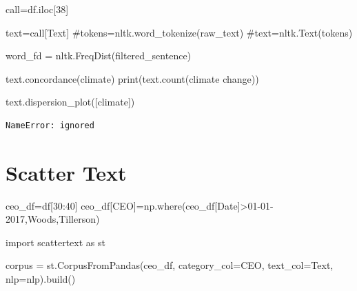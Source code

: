 \documentclass[
  letterpaper,
  DIV=11,
  numbers=noendperiod]{scrreprt}
\newenvironment{Shaded}{\begin{snugshade}}{\end{snugshade}}
\newcommand{\BuiltInTok}[1]{\textcolor[rgb]{0.00,0.23,0.31}{#1}}
\newcommand{\CommentTok}[1]{\textcolor[rgb]{0.37,0.37,0.37}{#1}}
\newcommand{\DecValTok}[1]{\textcolor[rgb]{0.68,0.00,0.00}{#1}}
\newcommand{\ImportTok}[1]{\textcolor[rgb]{0.00,0.46,0.62}{#1}}
\newcommand{\NormalTok}[1]{\textcolor[rgb]{0.00,0.23,0.31}{#1}}
\newcommand{\OperatorTok}[1]{\textcolor[rgb]{0.37,0.37,0.37}{#1}}
\newcommand{\StringTok}[1]{\textcolor[rgb]{0.13,0.47,0.30}{#1}}
\begin{document}
\begin{Shaded}
\begin{Highlighting}[]
\NormalTok{call}\OperatorTok{=}\NormalTok{df.iloc[}\DecValTok{38}\NormalTok{]}

\NormalTok{text}\OperatorTok{=}\NormalTok{call[}\StringTok{\textquotesingle{}Text\textquotesingle{}}\NormalTok{]}
\CommentTok{\#tokens=nltk.word\_tokenize(raw\_text)}
\CommentTok{\#text=nltk.Text(tokens)}

\NormalTok{word\_fd }\OperatorTok{=}\NormalTok{ nltk.FreqDist(filtered\_sentence)}

\NormalTok{text.concordance(}\StringTok{\textquotesingle{}climate\textquotesingle{}}\NormalTok{)}
\BuiltInTok{print}\NormalTok{(text.count(}\StringTok{\textquotesingle{}climate change\textquotesingle{}}\NormalTok{))}

\NormalTok{text.dispersion\_plot([}\StringTok{\textquotesingle{}climate\textquotesingle{}}\NormalTok{])}
\end{Highlighting}
\end{Shaded}

\begin{verbatim}
NameError: ignored
\end{verbatim}

\hypertarget{scatter-text}{%
\section{Scatter Text}\label{scatter-text}}

\begin{Shaded}
\begin{Highlighting}[]
\NormalTok{ceo\_df}\OperatorTok{=}\NormalTok{df[}\DecValTok{30}\NormalTok{:}\DecValTok{40}\NormalTok{]}
\NormalTok{ceo\_df[}\StringTok{\textquotesingle{}CEO\textquotesingle{}}\NormalTok{]}\OperatorTok{=}\NormalTok{np.where(ceo\_df[}\StringTok{\textquotesingle{}Date\textquotesingle{}}\NormalTok{]}\OperatorTok{\textgreater{}}\StringTok{\textquotesingle{}01{-}01{-}2017\textquotesingle{}}\NormalTok{,}\StringTok{\textquotesingle{}Woods\textquotesingle{}}\NormalTok{,}\StringTok{\textquotesingle{}Tillerson\textquotesingle{}}\NormalTok{)}

\ImportTok{import}\NormalTok{ scattertext }\ImportTok{as}\NormalTok{ st}

\NormalTok{corpus }\OperatorTok{=}\NormalTok{ st.CorpusFromPandas(ceo\_df,}
\NormalTok{                             category\_col}\OperatorTok{=}\StringTok{\textquotesingle{}CEO\textquotesingle{}}\NormalTok{,}
\NormalTok{                             text\_col}\OperatorTok{=}\StringTok{\textquotesingle{}Text\textquotesingle{}}\NormalTok{,}
\NormalTok{                             nlp}\OperatorTok{=}\NormalTok{nlp).build()}
\end{Highlighting}
\end{Shaded}
\end{document}
